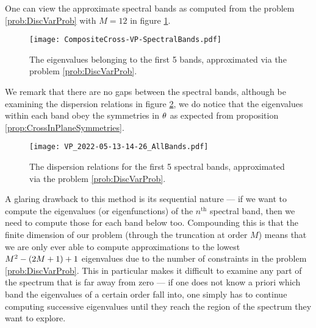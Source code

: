 One can view the approximate spectral bands as computed from the problem \ref{prob:DiscVarProb} with $M=12$ in figure \ref{fig:CompositeCross-VP-SpectralBands}.
\begin{figure}[b!]
	\centering
	\texttt{[image: CompositeCross-VP-SpectralBands.pdf]}
	\caption[optional text]{\label{fig:CompositeCross-VP-SpectralBands} The eigenvalues belonging to the first 5 bands, approximated via the problem \ref{prob:DiscVarProb}.}
\end{figure}
We remark that there are no gaps between the spectral bands, although be examining the dispersion relations in figure \ref{fig:VP_AllBands}, we do notice that the eigenvalues within each band obey the symmetries in $\theta$ as expected from proposition \ref{prop:CrossInPlaneSymmetries}.
\begin{figure}[t!]
	\centering
	\texttt{[image: VP\_2022-05-13-14-26\_AllBands.pdf]}
	\caption[optional text]{\label{fig:VP_AllBands} The dispersion relations for the first 5 spectral bands, approximated via the problem \ref{prob:DiscVarProb}.}
\end{figure}

A glaring drawback to this method is its sequential nature --- if we want to compute the eigenvalues (or eigenfunctions) of the $n^{\text{th}}$ spectral band, then we need to compute those for each band below too.
Compounding this is that the finite dimension of our problem (through the truncation at order $M$) means that we are only ever able to compute approximations to the lowest $M^2 - \left( 2M + 1 \right) + 1$ eigenvalues due to the number of constraints in the problem \ref{prob:DiscVarProb}.
This in particular makes it difficult to examine any part of the spectrum that is far away from zero --- if one does not know a priori which band the eigenvalues of a certain order fall into, one simply has to continue computing successive eigenvalues until they reach the region of the spectrum they want to explore.